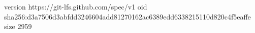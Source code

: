 version https://git-lfs.github.com/spec/v1
oid sha256:d3a7506d3abfdd3246604add81270162ac6389edd6338215110d820c4f5eaffe
size 2959
